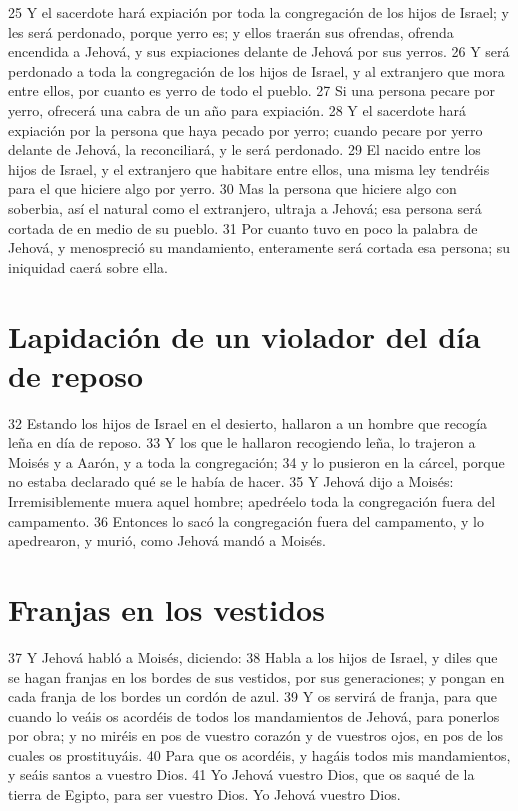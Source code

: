 25 Y el sacerdote hará expiación por toda la congregación de los hijos de Israel; y les será perdonado, porque yerro es; y ellos traerán sus ofrendas, ofrenda encendida a Jehová, y sus expiaciones delante de Jehová por sus yerros.
26 Y será perdonado a toda la congregación de los hijos de Israel, y al extranjero que mora entre ellos, por cuanto es yerro de todo el pueblo.
27 Si una persona pecare por yerro, ofrecerá una cabra de un año para expiación.
28 Y el sacerdote hará expiación por la persona que haya pecado por yerro; cuando pecare por yerro delante de Jehová, la reconciliará, y le será perdonado.
29 El nacido entre los hijos de Israel, y el extranjero que habitare entre ellos, una misma ley tendréis para el que hiciere algo por yerro.
30 Mas la persona que hiciere algo con soberbia, así el natural como el extranjero, ultraja a Jehová; esa persona será cortada de en medio de su pueblo.
31 Por cuanto tuvo en poco la palabra de Jehová, y menospreció su mandamiento, enteramente será cortada esa persona; su iniquidad caerá sobre ella.

\section*{Lapidación de un violador del día de reposo}

32 Estando los hijos de Israel en el desierto, hallaron a un hombre que recogía leña en día de reposo.
33 Y los que le hallaron recogiendo leña, lo trajeron a Moisés y a Aarón, y a toda la congregación;
34 y lo pusieron en la cárcel, porque no estaba declarado qué se le había de hacer.
35 Y Jehová dijo a Moisés: Irremisiblemente muera aquel hombre; apedréelo toda la congregación fuera del campamento.
36 Entonces lo sacó la congregación fuera del campamento, y lo apedrearon, y murió, como Jehová mandó a Moisés.

\section*{Franjas en los vestidos}

37 Y Jehová habló a Moisés, diciendo:
38 Habla a los hijos de Israel, y diles que se hagan franjas en los bordes de sus vestidos, por sus generaciones; y pongan en cada franja de los bordes un cordón de azul.
39 Y os servirá de franja, para que cuando lo veáis os acordéis de todos los mandamientos de Jehová, para ponerlos por obra; y no miréis en pos de vuestro corazón y de vuestros ojos, en pos de los cuales os prostituyáis.
40 Para que os acordéis, y hagáis todos mis mandamientos, y seáis santos a vuestro Dios.
41 Yo Jehová vuestro Dios, que os saqué de la tierra de Egipto, para ser vuestro Dios. Yo Jehová vuestro Dios.

